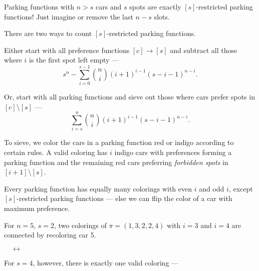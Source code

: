 \documentclass[thesis]{hmcposter}
\newcommand{\mzncar}[3][(0,0)]{
\begin{scope}[shift={#1}]
\shade[top color=#2, bottom color=#3, shading angle=90, draw=white, rounded corners=0.7ex, very thick] (0.75,.25) -- ++(0,0.5) -- ++(0.5,0.15) -- ++(1.5,0) -- ++(0.5,0) -- ++(0,-0.65) -- (0.75,.25) -- cycle;
\draw[thick, rounded corners=0.2ex, fill=white, thick] (1.25,0.85) -- ++(0.5,0.35) -- ++(0.8,0) -- ++(0.3,-0.35) -- (1.25,0.85);
\draw[thick] (2.1,0.85) -- (2.1,1.2);
\draw[fill=gray!80,thin] (1.375,.25) circle[radius=.2];
\draw[fill=gray!80,thin] (2.76,.25) circle[radius=.2];
\end{scope}
}
\begin{document}
\begin{poster}
Parking functions with $n > s$ cars and $s$ spots are exactly $[s]$-restricted parking functions! Just imagine or remove the last $n - s$ slots. 

There are two ways to count $[s]$-restricted parking functions.

Either start with all preference functions $[c] \to [s]$ and subtract all those where $i$ is the first spot left empty ---
\[
	s^{n} - \sum_{i = 0}^{s - 1} \binom{n}{i} (i + 1)^{i - 1} (s - i - 1)^{n - i}.
\]

Or, start with all parking functions and sieve out those where cars prefer spots in $[c] \setminus [s]$ ---
\[
	\sum_{i = s}^{n} \binom{n}{i} (i + 1)^{i - 1} (s - i - 1)^{n - i}.
\]

To sieve, we color the cars in a parking function red or indigo according to certain rules. A valid coloring has $i$ indigo cars with preferences forming a parking function and the remaining red cars preferring \emph{forbidden spots} in $[i + 1] \setminus [s]$.

Every parking function has equally many colorings with even $i$ and odd $i$, except $[s]$-restricted parking functions --- else we can flip the color of a car with maximum preference.

For $n=5$, $s = 2$, two colorings of $\pi = (1,3,2,2,4)$ with $i = 3$ and $i = 4$ are connected by recoloring car 5.
\begin{center}
 $\quad \longleftrightarrow \quad$
\end{center}

For $s = 4$, however, there is exactly one valid coloring ---

\begin{center}
\end{center}


\end{poster}
\end{document}
